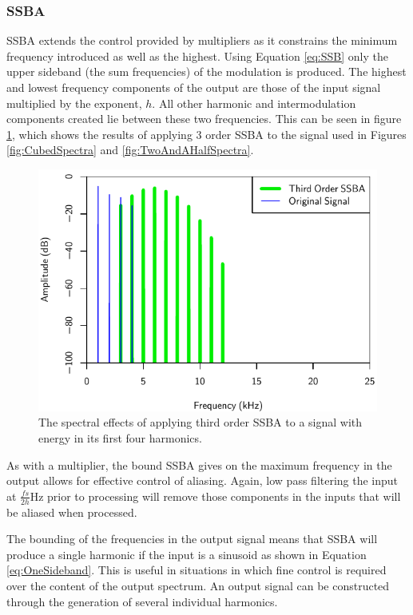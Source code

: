 		\subsubsection*{SSBA}
			SSBA extends the control provided by multipliers as it constrains the minimum frequency introduced
			as well as the highest. Using Equation \ref{eq:SSB} only the upper sideband (the sum frequencies)
			of the modulation is produced. The highest and lowest frequency components of the output are those
			of the input signal multiplied by the exponent, $h$. All other harmonic and intermodulation
			components created lie between these two frequencies. This can be seen in figure
			\ref{fig:SSBA3Spectra}, which shows the results of applying $3$ order SSBA to the signal
			used in Figures \ref{fig:CubedSpectra} and \ref{fig:TwoAndAHalfSpectra}. 			
			
			\begin{figure}[h!]
				\centering
				\includegraphics{chapter5/Images/SSBA3Spectra.pdf}
				\caption{The spectral effects of applying third order SSBA to a signal with energy in its 
				         first four harmonics.}
				\label{fig:SSBA3Spectra}
			\end{figure}

			As with a multiplier, the bound SSBA gives on the maximum frequency in the output allows for
			effective control of aliasing. Again, low pass filtering the input at $\frac{fs}{2h}$Hz prior to
			processing will remove those components in the inputs that will be aliased when processed.

			The bounding of the frequencies in the output signal means that SSBA will produce a single harmonic
			if the input is a sinusoid as shown in Equation \ref{eq:OneSideband}. This is useful in situations
			in which fine control is required over the content of the output spectrum. An output signal can be
			constructed through the generation of several individual harmonics.

